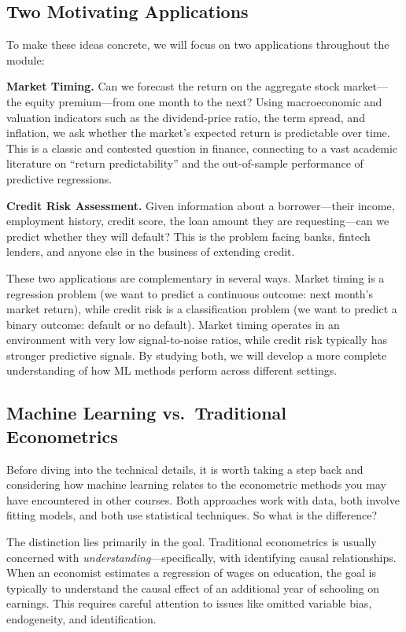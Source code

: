 \documentclass[11pt,a4paper]{article}
\begin{document}
\subsection{Two Motivating Applications}

To make these ideas concrete, we will focus on two applications throughout the module:

\textbf{Market Timing.} Can we forecast the return on the aggregate stock market---the equity premium---from one month to the next? Using macroeconomic and valuation indicators such as the dividend-price ratio, the term spread, and inflation, we ask whether the market's expected return is predictable over time. This is a classic and contested question in finance, connecting to a vast academic literature on ``return predictability'' and the out-of-sample performance of predictive regressions.

\textbf{Credit Risk Assessment.} Given information about a borrower---their income, employment history, credit score, the loan amount they are requesting---can we predict whether they will default? This is the problem facing banks, fintech lenders, and anyone else in the business of extending credit.

These two applications are complementary in several ways. Market timing is a regression problem (we want to predict a continuous outcome: next month's market return), while credit risk is a classification problem (we want to predict a binary outcome: default or no default). Market timing operates in an environment with very low signal-to-noise ratios, while credit risk typically has stronger predictive signals. By studying both, we will develop a more complete understanding of how ML methods perform across different settings.

\subsection{Machine Learning vs.\ Traditional Econometrics}

Before diving into the technical details, it is worth taking a step back and considering how machine learning relates to the econometric methods you may have encountered in other courses. Both approaches work with data, both involve fitting models, and both use statistical techniques. So what is the difference?

The distinction lies primarily in the goal. Traditional econometrics is usually concerned with \emph{understanding}---specifically, with identifying causal relationships. When an economist estimates a regression of wages on education, the goal is typically to understand the causal effect of an additional year of schooling on earnings. This requires careful attention to issues like omitted variable bias, endogeneity, and identification.
\end{document}
